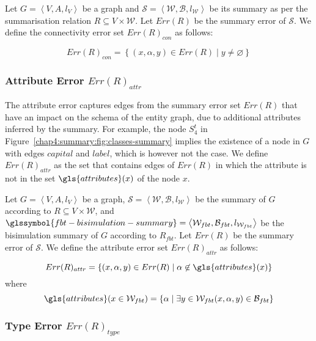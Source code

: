 \begin{definition}
Let $G=\left\langle V, A, l_V \right\rangle$ be a graph and $\mathcal{S} = \left\langle \mathcal{W}, \mathcal{B}, l_{\mathcal{W}} \right\rangle$ be its summary as per the summarisation relation $R \subseteq V \times \mathcal{W}$. Let $Err(R)$ be the summary error of $\mathcal{S}$. We define the connectivity error set $Err(R)_{con}$ as follows:

$$
Err(R)_{con} = \left\lbrace (x, \alpha, y) \in Err(R) \mid y \neq \varnothing \right\rbrace
$$
\end{definition}

\subsubsection{Attribute Error $Err(R)_{attr}$}

The attribute error captures edges from the summary error set $Err(R)$ that have an impact on the schema of the entity graph, due to additional \gls{attributes} inferred by the summary. For example, the node $S^t_4$ in Figure~\ref{chap4:summary:fig:classes-summary} implies the existence of a node in $G$ with edges $capital$ and $label$, which is however not the case. We define $Err(R)_{attr}$ as the set that contains edges of $Err(R)$ in which the attribute is not in the set $\gls{attributes}(x)$ of the node $x$.

\begin{definition}
	Let $G=\left\langle V, A, l_V \right\rangle$ be a graph, $\mathcal{S} = \left\langle \mathcal{W}, \mathcal{B}, l_{\mathcal{W}} \right\rangle$ be the summary of $G$ according to $R \subseteq V \times \mathcal{W}$, and $\glssymbol{fbt-bisimulation-summary} = \left\langle \mathcal{W}_{fbt}, \mathcal{B}_{fbt}, l_{\mathcal{W}_{fbt}} \right\rangle$ be the bisimulation summary of $G$ according to $R_{fbt}$. Let $Err(R)$ be the summary error of $\mathcal{S}$. We define the attribute error set $Err(R)_{attr}$ as follows:

	$$
	Err(R)_{attr} = \left\lbrace (x, \alpha, y) \in Err(R) \mid \alpha \not \in \gls{attributes}(x) \right\rbrace
	$$
	where
	$$
	\gls{attributes}(x \in \mathcal{W}_{fbt}) = \left\lbrace \alpha \mid \exists y \in \mathcal{W}_{fbt} (x, \alpha, y) \in \mathcal{B}_{fbt} \right\rbrace
	$$
\end{definition}

\subsubsection{Type Error $Err(R)_{type}$}

